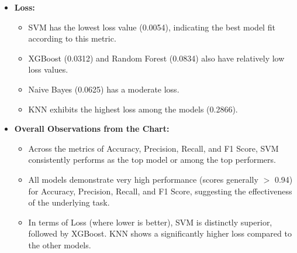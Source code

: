 \begin{itemize}
    \item \textbf{Loss:}
    \begin{itemize}
        \item SVM has the lowest loss value (0.0054), indicating the best model fit according to this metric.
        \item XGBoost (0.0312) and Random Forest (0.0834) also have relatively low loss values.
        \item Naive Bayes (0.0625) has a moderate loss.
        \item KNN exhibits the highest loss among the models (0.2866).
    \end{itemize}

    \item \textbf{Overall Observations from the Chart:}
    \begin{itemize}
        \item Across the metrics of Accuracy, Precision, Recall, and F1 Score, SVM consistently performs as the top model or among the top performers.
        \item All models demonstrate very high performance (scores generally $>$ 0.94) for Accuracy, Precision, Recall, and F1 Score, suggesting the effectiveness of the underlying task.
        \item In terms of Loss (where lower is better), SVM is distinctly superior, followed by XGBoost.
        KNN shows a significantly higher loss compared to the other models.
    \end{itemize}
\end{itemize}

\begin{table}[H]
    \centering
    \caption{Model Performance Comparison (Based on Bar Chart)}
    \setlength{\tabcolsep}{3pt}
    \renewcommand{\arraystretch}{1.2}
    \label{tab:model_performance_barchart}
\end{table}